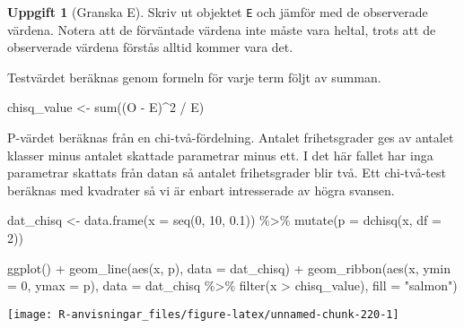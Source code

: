 \documentclass[
]{book}
\newenvironment{Shaded}{\begin{snugshade}}{\end{snugshade}}
\newcommand{\AttributeTok}[1]{\textcolor[rgb]{0.77,0.63,0.00}{#1}}
\newcommand{\DecValTok}[1]{\textcolor[rgb]{0.00,0.00,0.81}{#1}}
\newcommand{\FloatTok}[1]{\textcolor[rgb]{0.00,0.00,0.81}{#1}}
\newcommand{\FunctionTok}[1]{\textcolor[rgb]{0.00,0.00,0.00}{#1}}
\newcommand{\NormalTok}[1]{#1}
\newcommand{\OtherTok}[1]{\textcolor[rgb]{0.56,0.35,0.01}{#1}}
\newcommand{\SpecialCharTok}[1]{\textcolor[rgb]{0.00,0.00,0.00}{#1}}
\newcommand{\StringTok}[1]{\textcolor[rgb]{0.31,0.60,0.02}{#1}}
\theoremstyle{definition}
\theoremstyle{definition}
\theoremstyle{definition}
\newtheorem{exercise}{Uppgift}[chapter]
\theoremstyle{definition}
\theoremstyle{remark}
\begin{document}
\begin{exercise}[Granska E]
Skriv ut objektet \texttt{E} och jämför med de observerade värdena. Notera att de förväntade värdena inte måste vara heltal, trots att de observerade värdena förstås alltid kommer vara det.
\end{exercise}

Testvärdet beräknas genom formeln för varje term följt av summan.

\begin{Shaded}
\begin{Highlighting}[]
\NormalTok{chisq\_value }\OtherTok{\textless{}{-}} \FunctionTok{sum}\NormalTok{((O }\SpecialCharTok{{-}}\NormalTok{ E)}\SpecialCharTok{\^{}}\DecValTok{2} \SpecialCharTok{/}\NormalTok{ E)}
\end{Highlighting}
\end{Shaded}

P-värdet beräknas från en chi-två-fördelning. Antalet frihetsgrader ges av antalet klasser minus antalet skattade parametrar minus ett. I det här fallet har inga parametrar skattats från datan så antalet frihetsgrader blir två. Ett chi-två-test beräknas med kvadrater så vi är enbart intresserade av högra svansen.

\begin{Shaded}
\begin{Highlighting}[]
\NormalTok{dat\_chisq }\OtherTok{\textless{}{-}} \FunctionTok{data.frame}\NormalTok{(}\AttributeTok{x =} \FunctionTok{seq}\NormalTok{(}\DecValTok{0}\NormalTok{, }\DecValTok{10}\NormalTok{, }\FloatTok{0.1}\NormalTok{)) }\SpecialCharTok{\%\textgreater{}\%} 
  \FunctionTok{mutate}\NormalTok{(}\AttributeTok{p =} \FunctionTok{dchisq}\NormalTok{(x, }\AttributeTok{df =} \DecValTok{2}\NormalTok{))}

\FunctionTok{ggplot}\NormalTok{() }\SpecialCharTok{+}
  \FunctionTok{geom\_line}\NormalTok{(}\FunctionTok{aes}\NormalTok{(x, p), }\AttributeTok{data =}\NormalTok{ dat\_chisq) }\SpecialCharTok{+}
  \FunctionTok{geom\_ribbon}\NormalTok{(}\FunctionTok{aes}\NormalTok{(x, }\AttributeTok{ymin =} \DecValTok{0}\NormalTok{, }\AttributeTok{ymax =}\NormalTok{ p), }\AttributeTok{data =}\NormalTok{ dat\_chisq }\SpecialCharTok{\%\textgreater{}\%} \FunctionTok{filter}\NormalTok{(x }\SpecialCharTok{\textgreater{}}\NormalTok{ chisq\_value), }\AttributeTok{fill =} \StringTok{"salmon"}\NormalTok{)}
\end{Highlighting}
\end{Shaded}

\begin{center}\texttt{[image: R-anvisningar\_files/figure-latex/unnamed-chunk-220-1]} \end{center}
\end{document}
